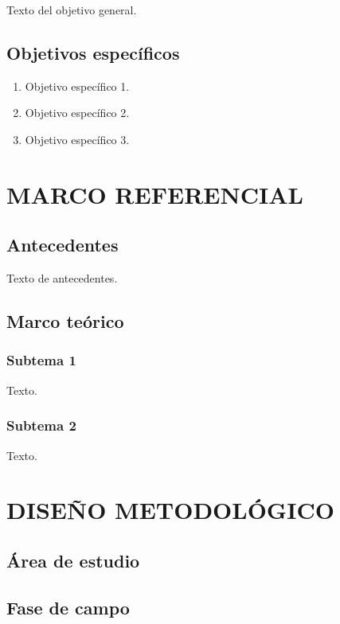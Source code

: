\documentclass[10pt]{report}
\begin{document}
Texto del objetivo general.

\section{Objetivos específicos}

\begin{enumerate}
    \item Objetivo específico 1.
    \item Objetivo específico 2.
    \item Objetivo específico 3.
\end{enumerate}

\chapter{MARCO REFERENCIAL}

\section{Antecedentes}

Texto de antecedentes.

\section{Marco teórico}

\subsection{Subtema 1}

Texto.

\subsection{Subtema 2}

Texto.

\chapter{DISEÑO METODOLÓGICO}

\section{Área de estudio}

\section{Fase de campo}
\end{document}
